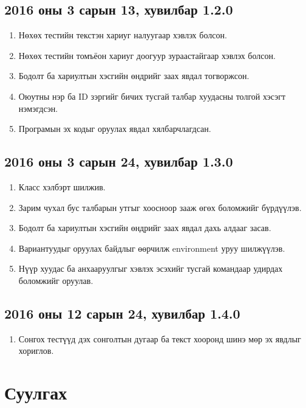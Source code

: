 \documentclass[10pt]{article}
\theoremstyle{definition}
\begin{document}
\subsection{2016 оны 3 сарын 13, хувилбар 1.2.0}

\begin{enumerate}
 \item Нөхөх тестийн текстэн хариуг налуугаар хэвлэх болсон.
 \item Нөхөх тестийн томъёон хариуг доогуур зураастайгаар хэвлэх болсон.
 \item Бодолт ба хариултын хэсгийн өндрийг заах явдал тогворжсон.
 \item Оюутны нэр ба ID зэргийг бичих тусгай талбар хуудасны толгой хэсэгт нэмэгдсэн.
 \item Програмын эх кодыг оруулах явдал хялбарчлагдсан.
\end{enumerate}

\subsection{2016 оны 3 сарын 24, хувилбар 1.3.0}

\begin{enumerate}
 \item Класс хэлбэрт шилжив.
 \item Зарим чухал бус талбарын утгыг хоосноор зааж өгөх боломжийг бүрдүүлэв.
 \item Бодолт ба хариултын хэсгийн өндрийг заах явдал дахь алдааг засав.
 \item Вариантуудыг оруулах байдлыг өөрчилж environment уруу шилжүүлэв.
 \item Нүүр хуудас ба анхааруулгыг хэвлэх эсэхийг тусгай командаар удирдах боломжийг оруулав.
\end{enumerate}

\subsection{2016 оны 12 сарын 24, хувилбар 1.4.0}

\begin{enumerate}
 \item Сонгох тестүүд дэх сонголтын дугаар ба текст хооронд шинэ мөр эх явдлыг хориглов.
\end{enumerate}

\section{Суулгах}
\end{document}

